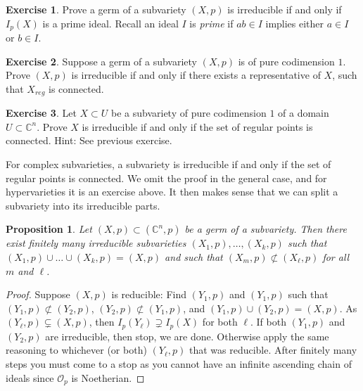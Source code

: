\documentclass[12pt,openany]{book}
\newcommand{\C}{{\mathbb{C}}}
\newcommand{\sO}{{\mathscr{O}}}
\theoremstyle{plain}
\newtheorem{prop}[thm]{Proposition}
\theoremstyle{remark}
\theoremstyle{definition}
\newenvironment{exbox}{%
    \def\FrameCommand{\vrule width 1pt \relax\hspace{10pt}}%
    \MakeFramed{\advance\hsize-\width\FrameRestore}%
}{%
    \endMakeFramed
}
\theoremstyle{exercise}
\newtheorem{exercise}{Exercise}[section]
\theoremstyle{example}
\newcommand{\thmref}[1]{\hyperref[#1]{Theorem~\ref*{#1}}}
\begin{document}
\begin{exbox}
\begin{exercise}
Prove a germ of a subvariety $(X,p)$ is irreducible
if and only if $I_p(X)$ is a prime ideal.
Recall an ideal $I$ is \emph{prime}
if $ab \in I$ implies either $a \in I$ or $b
\in I$.
\end{exercise}

\begin{exercise}
Suppose a germ of a subvariety $(X,p)$ is of pure codimension $1$.
Prove $(X,p)$ is irreducible if and only if there
exists a representative of $X$, such that $X_{\textit{reg}}$
is connected.  %
\end{exercise}

\begin{exercise}
Let $X \subset U$ be a subvariety of pure codimension $1$ of a domain $U
\subset \C^n$.
Prove $X$ is irreducible if and only if the set of regular points
is connected.  Hint: See previous exercise.
\end{exercise}
\end{exbox}

For complex subvarieties, a subvariety is irreducible if
and only if the set of regular points is connected.  We omit the proof
in the general case, and for hypervarieties it is an exercise above.
It then makes sense that we can split a subvariety into its irreducible parts.

\begin{prop}
Let $(X,p) \subset (\C^n,p)$ be a germ of a subvariety.  Then there exist
finitely many irreducible subvarieties $(X_1,p),\ldots,(X_k,p)$ such that
$(X_1,p) \cup \ldots \cup (X_k,p) = (X,p)$ and such that $(X_m,p)
\not\subset (X_\ell,p)$ for all $m$ and $\ell$.
\end{prop}

\begin{proof}
Suppose $(X,p)$ is reducible:
Find $(Y_1,p)$ and $(Y_1,p)$ such that $(Y_1,p) \not\subset (Y_2,p)$,
$(Y_2,p) \not\subset (Y_1,p)$, and
$(Y_1,p) \cup (Y_2,p) = (X,p)$.
As $(Y_\ell,p) \subsetneq (X,p)$, then
$I_p(Y_\ell) \supsetneq I_p(X)$ for both $\ell$.  If both
$(Y_1,p)$ and $(Y_2,p)$ are irreducible, then stop, we are done.  Otherwise
apply the same reasoning to whichever (or both) $(Y_\ell,p)$ that was
reducible.  After finitely many steps you must come to a stop as you cannot
have an infinite ascending chain of ideals since $\sO_p$ is Noetherian.
\end{proof}
\end{document}
